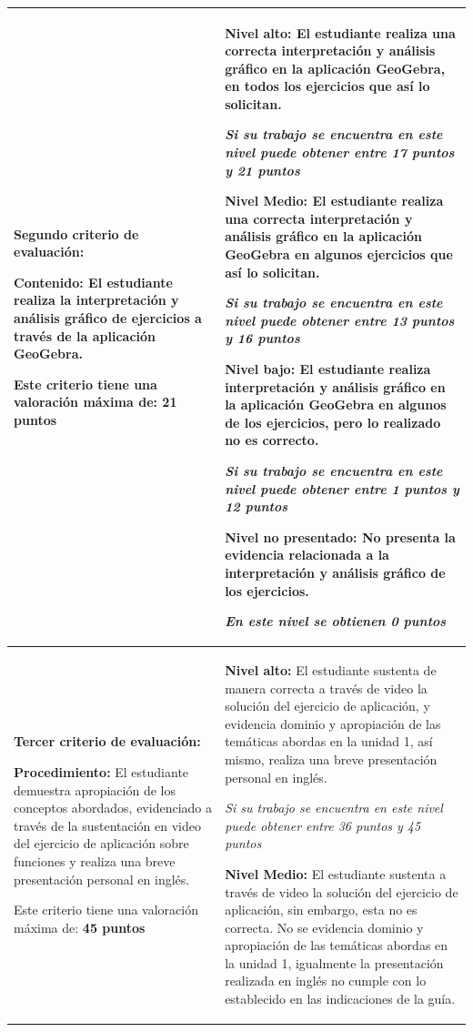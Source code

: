 \documentclass[12pt,letterpaper]{article}
\begin{document}
\newpage

\begin{tabularx}{\textwidth}{|>{\bfseries}p{4cm}|X|}
\hline
\textbf{Segundo criterio de evaluación:}

\textbf{Contenido:}
El estudiante realiza la interpretación y análisis gráfico de ejercicios a través de la aplicación GeoGebra.

Este criterio tiene una valoración máxima de: \textbf{21 puntos} & 
\textbf{Nivel alto:} El estudiante realiza una correcta interpretación y análisis gráfico en la aplicación GeoGebra, en todos los ejercicios que así lo solicitan.

\textit{Si su trabajo se encuentra en este nivel puede obtener entre 17 puntos y 21 puntos}

\textbf{Nivel Medio:} El estudiante realiza una correcta interpretación y análisis gráfico en la aplicación GeoGebra en algunos ejercicios que así lo solicitan.

\textit{Si su trabajo se encuentra en este nivel puede obtener entre 13 puntos y 16 puntos}

\textbf{Nivel bajo:} El estudiante realiza interpretación y análisis gráfico en la aplicación GeoGebra en algunos de los ejercicios, pero lo realizado no es correcto.

\textit{Si su trabajo se encuentra en este nivel puede obtener entre 1 puntos y 12 puntos}

\textbf{Nivel no presentado:} No presenta la evidencia relacionada a la interpretación y análisis gráfico de los ejercicios.

\textit{En este nivel se obtienen 0 puntos} \\
\hline
\textbf{Tercer criterio de evaluación:}

\textbf{Procedimiento:}
El estudiante demuestra apropiación de los conceptos abordados, evidenciado a través de la sustentación en video del ejercicio de aplicación sobre funciones y realiza una breve presentación personal en inglés.

Este criterio tiene una valoración máxima de: \textbf{45 puntos} & 
\textbf{Nivel alto:} El estudiante sustenta de manera correcta a través de video la solución del ejercicio de aplicación, y evidencia dominio y apropiación de las temáticas abordas en la unidad 1, así mismo, realiza una breve presentación personal en inglés.

\textit{Si su trabajo se encuentra en este nivel puede obtener entre 36 puntos y 45 puntos}

\textbf{Nivel Medio:} El estudiante sustenta a través de video la solución del ejercicio de aplicación, sin embargo, esta no es correcta. No se evidencia dominio y apropiación de las temáticas abordas en la unidad 1, igualmente la presentación realizada en inglés no cumple con lo establecido en las indicaciones de la guía.


\end{tabularx}
\end{document}
